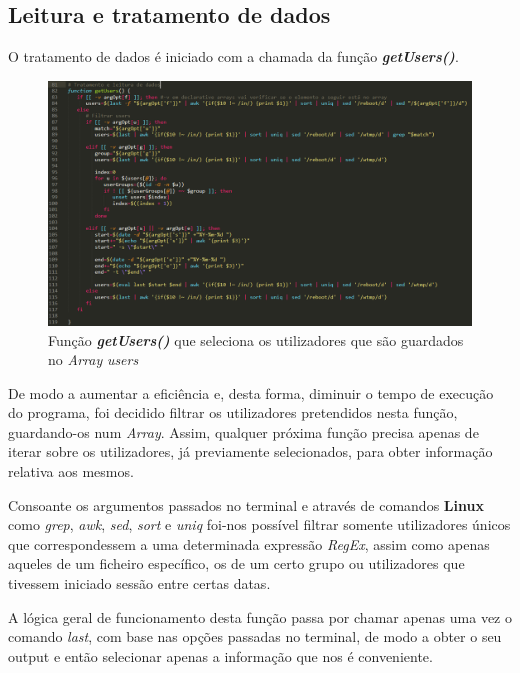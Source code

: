 \documentclass[10pt,portuguese]{article}
\begin{document}
\clearpage 

\subsection{Leitura e tratamento de dados}
\newline
\par O tratamento de dados é iniciado com a chamada da função \textbf{\textit{getUsers()}}.
\begin{figure}[!h]
    \centering
    \includegraphics[width=\textwidth]{getUsers.PNG}
    \caption{Função \textbf{\textit{getUsers()}} que seleciona os utilizadores que são guardados no \textit{Array} \textit{users}}
\end{figure}
\par De modo a aumentar a eficiência e, desta forma, diminuir o tempo de execução do programa, foi decidido filtrar os utilizadores pretendidos nesta função, guardando-os num \textit{Array}. Assim, qualquer próxima função precisa apenas de iterar sobre os utilizadores, já previamente selecionados, para obter informação relativa aos mesmos.
\par Consoante os argumentos passados no terminal e através de comandos \textbf{Linux} como \textit{grep}, \textit{awk}, \textit{sed}, \textit{sort} e \textit{uniq} foi-nos possível filtrar somente utilizadores únicos que correspondessem a uma determinada expressão \textit{RegEx}, assim como apenas aqueles de um ficheiro específico, os de um certo grupo ou utilizadores que tivessem iniciado sessão entre certas datas.
\par A lógica geral de funcionamento desta função passa por chamar apenas uma vez o comando \textit{last}, com base nas opções passadas no terminal, de modo a obter o seu output e então selecionar apenas a informação que nos é conveniente.
\end{document}
